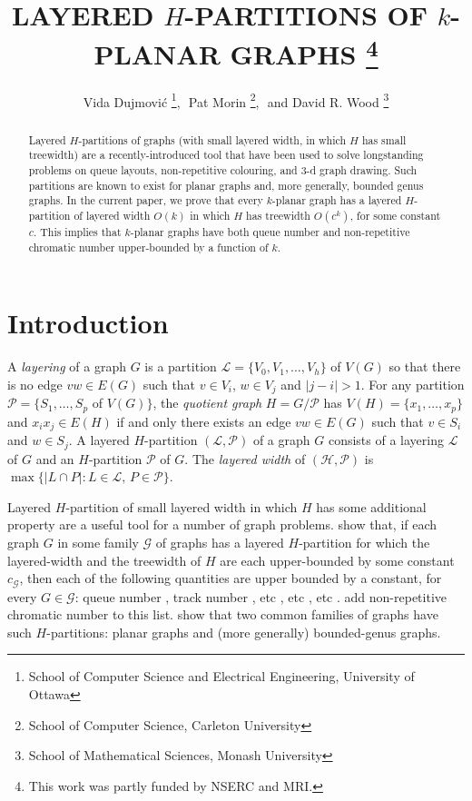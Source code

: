 \documentclass{patmorin}
\title{\MakeUppercase{Layered $H$-Partitions of $k$-Planar Graphs}%
    \thanks{This work was partly funded by NSERC and MRI.}}
\author{Vida Dujmovi\'c%
        \thanks{School of Computer Science and Electrical Engineering,
                University of Ottawa},\,\,
        Pat Morin%
        \thanks{School of Computer Science, Carleton University},\,\, and
        David R. Wood%
        \thanks{School of Mathematical Sciences, Monash University}}
\begin{document}
\maketitle


\begin{abstract}
  Layered $H$-partitions of graphs (with small layered width, in which $H$ has small treewidth) are a recently-introduced tool that have been used to solve longstanding problems on queue layouts, non-repetitive colouring, and 3-d graph drawing.  Such partitions are known to exist for planar graphs and, more generally, bounded genus graphs.  In the current paper, we prove that every $k$-planar graph has a layered $H$-partition of layered width $O(k)$ in which $H$ has treewidth $O(c^k)$, for some constant $c$. This implies that $k$-planar graphs have both queue number and non-repetitive chromatic number upper-bounded by a function of $k$.
\end{abstract}

\section{Introduction}

A \emph{layering} of a graph $G$ is a partition $\mathcal{L}=\{V_0,V_1,\ldots,V_h\}$ of $V(G)$ so that there is no edge $vw\in E(G)$ such that $v\in V_i$, $w\in V_j$ and $|j-i|>1$.  For any partition $\mathcal{P}=\{S_1,\ldots,S_p$ of $V(G)\}$, the \emph{quotient graph} $H=G/\mathcal{P}$ has $V(H)=\{x_1,\ldots,x_p\}$ and $x_ix_j\in E(H)$ if and only there exists an edge $vw\in E(G)$ such that $v\in S_i$ and $w\in S_j$.  
A layered $H$-partition $(\mathcal{L},\mathcal{P})$ of a graph $G$ consists of a layering $\mathcal{L}$ of $G$ and an $H$-partition $\mathcal{P}$ of $G$. The \emph{layered width} of $(\mathcal{H},\mathcal{P})$ is $\max\{|L\cap P|: L\in\mathcal{L},\, P\in\mathcal{P}\}$.

Layered $H$-partition of small layered width in which $H$ has some additional property are a useful tool for a number of graph problems. \citet{dujmovic.joret.ea:planar} show that, if each graph $G$ in some family $\mathcal{G}$ of graphs has a layered $H$-partition for which the layered-width and the treewidth of $H$ are each upper-bounded by some constant $c_\mathcal{G}$, then each of the following quantities are upper bounded by a constant, for every $G\in\mathcal{G}$: queue number \cite{X}, track number \cite{X}, etc \cite{X}, etc \cite{X}, etc \cite{X}. \citet{dujmovic.esperet.ea:planar} add non-repetitive chromatic number to this list.  \citet{dujmovic.joret.ea:planar} show that two common families of graphs have such $H$-partitions: planar graphs and (more generally) bounded-genus graphs.
\end{document}
